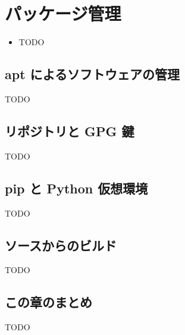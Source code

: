 \chapter{パッケージ管理}
\label{chap:package}

\begin{goalbox}
  \begin{itemize}
    \item TODO
  \end{itemize}
\end{goalbox}

\section{apt によるソフトウェアの管理}

TODO

\section{リポジトリと GPG 鍵}

TODO

\section{pip と Python 仮想環境}

TODO

\section{ソースからのビルド}

TODO

\section*{この章のまとめ}

TODO
